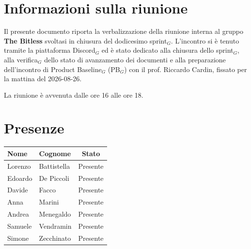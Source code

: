 \documentclass[a4paper, 10pt, colorlinks=true, linkcolor=black, urlcolor=blue, citecolor=blue, hidelinks]{article}
\begin{document}
\newcommand{\titolo}{Verbale interno}
\newcommand{\dataverbale}{2026-08-25}
\newcommand{\dataversione}{2026-08-25}
\newcommand{\versione}{0.1.0}
\newcommand{\stato}{Stesura}
\newcommand{\destinatari}{The Bitless, prof. Tullio Vardanega, prof. Riccardo Cardin}
\def\templatedir{../../../../templates}

\begin{titlepage}

\end{titlepage}

\newpage
\tableofcontents

\newpage
{}
\section{Informazioni sulla riunione}
Il presente documento riporta la verbalizzazione della riunione interna al gruppo \textbf{The Bitless} svoltasi in chiusura del dodicesimo sprint$_G$. L'incontro si è tenuto tramite la piattaforma Discord$_G$ ed è stato dedicato alla chiusura dello sprint$_G$, alla verifica$_G$ dello stato di avanzamento dei documenti e alla preparazione dell'incontro di Product Baseline$_G$ (PB$_G$) con il prof. Riccardo Cardin, fissato per la mattina del 2026-08-26.

\noindent La riunione è avvenuta dalle ore 16 alle ore 18.

\section{Presenze}
\begin{center}
\begin{tabular}{|l|l|c|}
\hline
\textbf{Nome} & \textbf{Cognome} & \textbf{Stato} \\
\hline
Lorenzo & Battistella & Presente \\
Edoardo & De Piccoli & Presente \\
Davide & Facco & Presente \\
Anna & Marini & Presente \\
Andrea & Menegaldo & Presente \\
Samuele & Vendramin & Presente \\
Simone & Zecchinato & Presente \\
\hline
\end{tabular}
\end{center}
\end{document}
